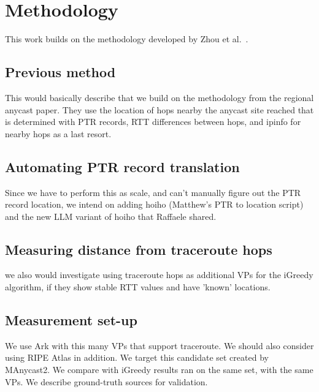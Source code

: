 
\section{Methodology}\label{methodology}
This work builds on the methodology developed by Zhou et al.~\cite{regional}.
\subsection{Previous method}
This would basically describe that we build on the methodology from the regional anycast paper.
They use the location of hops nearby the anycast site reached that is determined with PTR records, RTT differences between hops, and ipinfo for nearby hops as a last resort.

\subsection{Automating PTR record translation}
Since we have to perform this as scale, and can't manually figure out the PTR record location, we intend on adding hoiho (Matthew's PTR to location script) and the new LLM variant of hoiho that Raffaele shared.

\subsection{Measuring distance from traceroute hops}
we also would investigate using traceroute hops as additional VPs for the iGreedy algorithm, if they show stable RTT values and have 'known' locations.

\subsection{Measurement set-up}
We use Ark with this many VPs that support traceroute.
We should also consider using RIPE Atlas in addition.
We target this candidate set created by MAnycast2.
We compare with iGreedy results ran on the same set, with the same VPs.
We describe ground-truth sources for validation.